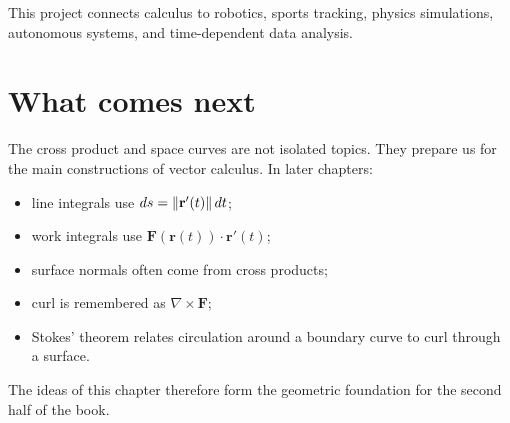 This project connects calculus to robotics, sports tracking, physics simulations, autonomous systems, and time-dependent data analysis.

\section{What comes next}

The cross product and space curves are not isolated topics. They prepare us for the main constructions of vector calculus. In later chapters:
\begin{itemize}
\item line integrals use $ds=\left\lVert \mathbf r'(t)\right\rVert dt$;
\item work integrals use $\mathbf F(\mathbf r(t))\cdot\mathbf r'(t)$;
\item surface normals often come from cross products;
\item curl is remembered as $\nabla\times\mathbf F$;
\item Stokes' theorem relates circulation around a boundary curve to curl through a surface.
\end{itemize}
The ideas of this chapter therefore form the geometric foundation for the second half of the book.


